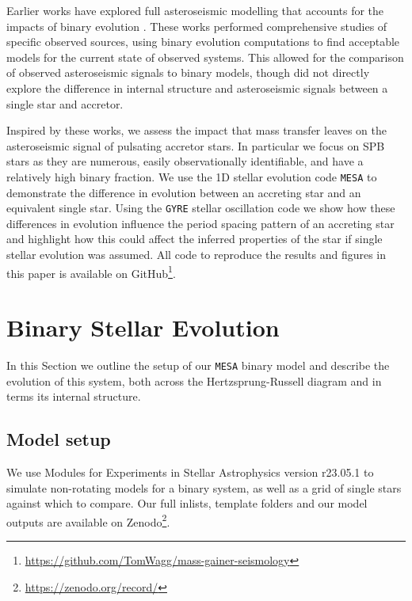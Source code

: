 \documentclass[twocolumn, twocolappendix, oneside]{aastex631}
\newcommand{\hrd}{Hertzsprung-Russell diagram\xspace}
\newcommand{\mesa}{\texttt{MESA}\xspace}
\newcommand{\gyre}{\texttt{GYRE}\xspace}
\begin{document}
Earlier works have explored full asteroseismic modelling that accounts for the impacts of binary evolution \citep{Guo+2017:2017ApJ...837..114G, Miszuda+2021, Miszuda+2022:2022MNRAS.514..622M}. These works performed comprehensive studies of specific observed sources, using binary evolution computations to find acceptable models for the current state of observed systems. This allowed for the comparison of observed asteroseismic signals to binary models, though did not directly explore the difference in internal structure and asteroseismic signals between a single star and accretor.

Inspired by these works, we assess the impact that mass transfer leaves on the asteroseismic signal of pulsating accretor stars. In particular we focus on SPB stars as they are numerous, easily observationally identifiable, and have a relatively high binary fraction. We use the 1D stellar evolution code \mesa to demonstrate the difference in evolution between an accreting star and an equivalent single star. Using the \gyre stellar oscillation code we show how these differences in evolution influence the period spacing pattern of an accreting star and highlight how this could affect the inferred properties of the star if single stellar evolution was assumed. All code to reproduce the results and figures in this paper is available on GitHub\footnote{\url{https://github.com/TomWagg/mass-gainer-seismology}}.

\section{Binary Stellar Evolution} \label{sec:methods}

In this Section we outline the setup of our \mesa binary model and describe the evolution of this system, both across the \hrd and in terms its internal structure.

\subsection{Model setup}\label{sec:model_setup}

We use Modules for Experiments in Stellar Astrophysics \citep[\mesa,][]{Paxton2011, Paxton2013, Paxton2015, Paxton2018, Paxton2019, Jermyn2023} version r23.05.1 \citep{mesa_zenodo} to simulate non-rotating models for a binary system, as well as a grid of single stars against which to compare. Our full inlists, template folders and our model outputs are available on Zenodo\footnote{\url{https://zenodo.org/record/}}.
\end{document}

